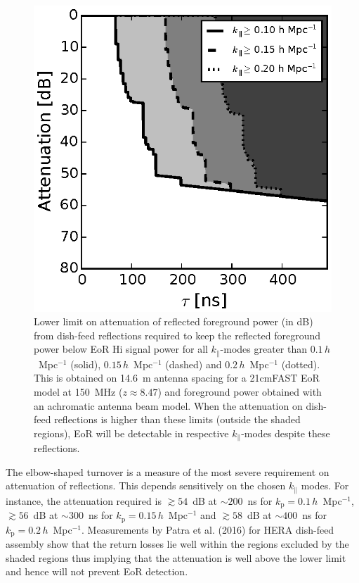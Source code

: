 \documentclass[preprint2,iop,numberedappendix,twocolappendix,appendixfloats]{emulateapj}
\begin{document}
\begin{figure}[htb]
\centering
\includegraphics[width=\linewidth]{spec_on_achrmbeam_foreground_reflected_power_21cmfast_14.6m_150.0_MHz_subband_v2.eps}
\caption{Lower limit on attenuation of reflected foreground power (in dB) from dish-feed reflections required to keep the reflected foreground power below EoR H{\sc i} signal power for all $k_\parallel$-modes greater than $0.1\,h$~Mpc$^{-1}$ (solid), $0.15\,h$~Mpc$^{-1}$ (dashed) and $0.2\,h$~Mpc$^{-1}$ (dotted). This is obtained on 14.6~m antenna spacing for a 21cmFAST EoR model at 150~MHz ($z\approx 8.47$) and foreground power obtained with an achromatic antenna beam model. When the attenuation on dish-feed reflections is higher than these limits (outside the shaded regions), EoR will be detectable in respective $k_\parallel$-modes despite these reflections.}
\label{fig:fg-reflections-achrmbeam}
\end{figure}

The elbow-shaped turnover is a measure of the most severe requirement on attenuation of reflections. This depends sensitively on the chosen $k_\parallel$ modes. For instance, the attenuation required is $\gtrsim 54$~dB at $\sim 200$~ns for $k_\textrm{p}=0.1\,h$~Mpc$^{-1}$, $\gtrsim 56$~dB at $\sim 300$~ns for $k_\textrm{p}=0.15\,h$~Mpc$^{-1}$ and $\gtrsim 58$~dB at $\sim 400$~ns for $k_\textrm{p}=0.2\,h$~Mpc$^{-1}$. Measurements by Patra et al. (2016) for HERA dish-feed assembly show that the return losses lie well within the regions excluded by the shaded regions thus implying that the attenuation is well above the lower limit and hence will not prevent EoR detection.
\end{document}

